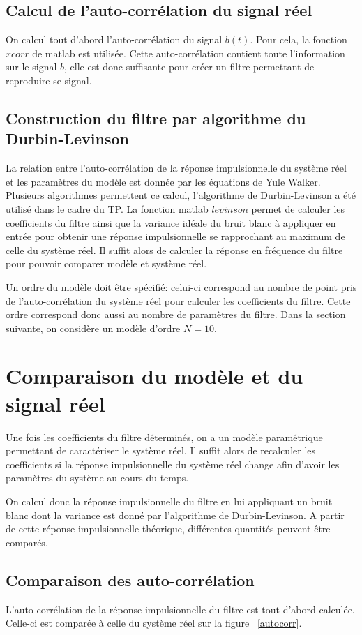 \documentclass[a4paper]{article}
\begin{document}
\subsection{Calcul de l'auto-corrélation du signal réel}
On calcul tout d'abord l'auto-corrélation du signal $b(t)$. Pour cela, la fonction $xcorr$ de matlab est utilisée. Cette auto-corrélation contient toute l'information sur le signal $b$, elle est donc suffisante pour créer un filtre permettant de reproduire se signal.

\subsection{Construction du filtre par algorithme du Durbin-Levinson}
La relation entre l'auto-corrélation de la réponse impulsionnelle du système réel et les paramètres du modèle est donnée par les équations de Yule Walker. Plusieurs algorithmes permettent ce calcul, l'algorithme de Durbin-Levinson a été utilisé dans le cadre du TP. La fonction matlab $levinson$ permet de calculer les coefficients du filtre ainsi que la variance idéale du bruit blanc à appliquer en entrée pour obtenir une réponse impulsionnelle se rapprochant au maximum de celle du système réel. Il suffit alors de calculer la réponse en fréquence du filtre pour pouvoir comparer modèle et système réel.

\bigskip
Un ordre du modèle doit être spécifié: celui-ci correspond au nombre de point pris de l'auto-corrélation du système réel pour calculer les coefficients du filtre. Cette ordre correspond donc aussi au nombre de paramètres du filtre. Dans la section suivante, on considère un modèle d'ordre $N=10$.

\section{Comparaison du modèle et du signal réel}
Une fois les coefficients du filtre déterminés, on a un modèle paramétrique permettant de caractériser le système réel. Il suffit alors de recalculer les coefficients si la réponse impulsionnelle du système réel change afin d'avoir les paramètres du système au cours du temps.

On calcul donc la réponse impulsionnelle du filtre en lui appliquant un bruit blanc dont la variance est donné par l'algorithme de Durbin-Levinson. A partir de cette réponse impulsionnelle théorique, différentes quantités peuvent être comparés.

\subsection{Comparaison des auto-corrélation}
L'auto-corrélation de la réponse impulsionnelle du filtre est tout d'abord calculée. Celle-ci est comparée à celle du système réel sur la figure ~\ref{autocorr}.
\end{document}
